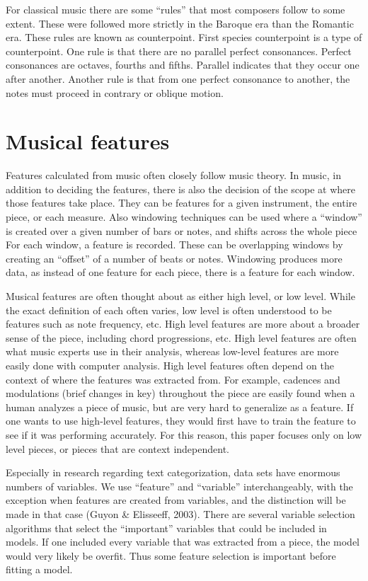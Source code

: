 \documentclass[12pt,twoside]{reedthesis}
\theoremstyle{definition}
\theoremstyle{definition}
\theoremstyle{definition}
\theoremstyle{remark}
\begin{document}
For classical music there are some ``rules'' that most composers follow
to some extent. These were followed more strictly in the Baroque era
than the Romantic era. These rules are known as counterpoint. First
species counterpoint is a type of counterpoint. One rule is that there
are no parallel perfect consonances. Perfect consonances are octaves,
fourths and fifths. Parallel indicates that they occur one after
another. Another rule is that from one perfect consonance to another,
the notes must proceed in contrary or oblique motion.

\section{Musical features}\label{musical-features}

Features calculated from music often closely follow music theory. In
music, in addition to deciding the features, there is also the decision
of the scope at where those features take place. They can be features
for a given instrument, the entire piece, or each measure. Also
windowing techniques can be used where a ``window'' is created over a
given number of bars or notes, and shifts across the whole piece For
each window, a feature is recorded. These can be overlapping windows by
creating an ``offset'' of a number of beats or notes. Windowing produces
more data, as instead of one feature for each piece, there is a feature
for each window.

Musical features are often thought about as either high level, or low
level. While the exact definition of each often varies, low level is
often understood to be features such as note frequency, etc. High level
features are more about a broader sense of the piece, including chord
progressions, etc. High level features are often what music experts use
in their analysis, whereas low-level features are more easily done with
computer analysis. High level features often depend on the context of
where the features was extracted from. For example, cadences and
modulations (brief changes in key) throughout the piece are easily found
when a human analyzes a piece of music, but are very hard to generalize
as a feature. If one wants to use high-level features, they would first
have to train the feature to see if it was performing accurately. For
this reason, this paper focuses only on low level pieces, or pieces that
are context independent.

Especially in research regarding text categorization, data sets have
enormous numbers of variables. We use ``feature'' and ``variable''
interchangeably, with the exception when features are created from
variables, and the distinction will be made in that case (Guyon \&
Elisseeff, 2003). There are several variable selection algorithms that
select the ``important'' variables that could be included in models. If
one included every variable that was extracted from a piece, the model
would very likely be overfit. Thus some feature selection is important
before fitting a model.
\end{document}
